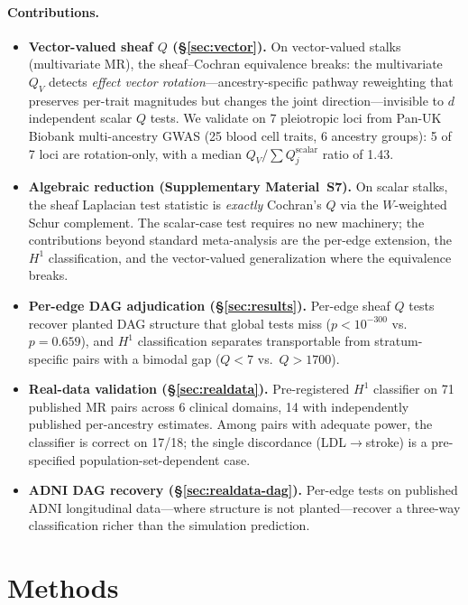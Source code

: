 \documentclass[11pt]{article}
\begin{document}
\paragraph{Contributions.}
\begin{itemize}
\item \textbf{Vector-valued sheaf $Q$ (\S\ref{sec:vector}).} On vector-valued stalks (multivariate MR), the sheaf--Cochran equivalence breaks: the multivariate $Q_V$ detects \emph{effect vector rotation}---ancestry-specific pathway reweighting that preserves per-trait magnitudes but changes the joint direction---invisible to $d$ independent scalar $Q$ tests. We validate on 7 pleiotropic loci from Pan-UK Biobank multi-ancestry GWAS (25 blood cell traits, 6 ancestry groups): 5 of 7 loci are rotation-only, with a median $Q_V / \sum Q_j^{\mathrm{scalar}}$ ratio of 1.43.
\item \textbf{Algebraic reduction (Supplementary Material~S7).} On scalar stalks, the sheaf Laplacian test statistic is \emph{exactly} Cochran's $Q$ via the $W$-weighted Schur complement. The scalar-case test requires no new machinery; the contributions beyond standard meta-analysis are the per-edge extension, the $H^1$ classification, and the vector-valued generalization where the equivalence breaks.
\item \textbf{Per-edge DAG adjudication (\S\ref{sec:results}).} Per-edge sheaf $Q$ tests recover planted DAG structure that global tests miss ($p < 10^{-300}$ vs.\ $p = 0.659$), and $H^1$ classification separates transportable from stratum-specific pairs with a bimodal gap ($Q < 7$ vs.\ $Q > 1700$).
\item \textbf{Real-data validation (\S\ref{sec:realdata}).} Pre-registered $H^1$ classifier on 71 published MR pairs across 6 clinical domains, 14 with independently published per-ancestry estimates. Among pairs with adequate power, the classifier is correct on 17/18; the single discordance (LDL$\to$stroke) is a pre-specified population-set-dependent case.
\item \textbf{ADNI DAG recovery (\S\ref{sec:realdata-dag}).} Per-edge tests on published ADNI longitudinal data---where structure is not planted---recover a three-way classification richer than the simulation prediction.
\end{itemize}

\section{Methods}
\label{sec:methods}
\end{document}
